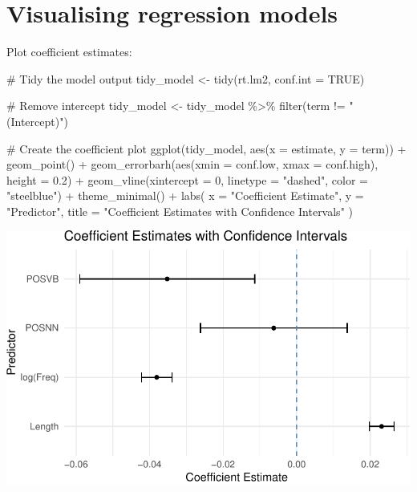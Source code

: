 \documentclass[
  11pt,
  letterpaper,
  DIV=11,
  numbers=noendperiod]{scrreprt}
\newenvironment{Shaded}{\begin{snugshade}}{\end{snugshade}}
\newcommand{\AttributeTok}[1]{\textcolor[rgb]{0.40,0.45,0.13}{#1}}
\newcommand{\CommentTok}[1]{\textcolor[rgb]{0.37,0.37,0.37}{#1}}
\newcommand{\ConstantTok}[1]{\textcolor[rgb]{0.56,0.35,0.01}{#1}}
\newcommand{\DecValTok}[1]{\textcolor[rgb]{0.68,0.00,0.00}{#1}}
\newcommand{\FloatTok}[1]{\textcolor[rgb]{0.68,0.00,0.00}{#1}}
\newcommand{\FunctionTok}[1]{\textcolor[rgb]{0.28,0.35,0.67}{#1}}
\newcommand{\NormalTok}[1]{\textcolor[rgb]{0.00,0.23,0.31}{#1}}
\newcommand{\OtherTok}[1]{\textcolor[rgb]{0.00,0.23,0.31}{#1}}
\newcommand{\SpecialCharTok}[1]{\textcolor[rgb]{0.37,0.37,0.37}{#1}}
\newcommand{\StringTok}[1]{\textcolor[rgb]{0.13,0.47,0.30}{#1}}
\begin{document}
\section{Visualising regression
models}\label{visualising-regression-models}

Plot coefficient estimates:

\begin{Shaded}
\begin{Highlighting}[]
\CommentTok{\# Tidy the model output}
\NormalTok{tidy\_model }\OtherTok{\textless{}{-}} \FunctionTok{tidy}\NormalTok{(rt.lm2, }\AttributeTok{conf.int =} \ConstantTok{TRUE}\NormalTok{)}

\CommentTok{\# Remove intercept}
\NormalTok{tidy\_model }\OtherTok{\textless{}{-}}\NormalTok{ tidy\_model }\SpecialCharTok{\%\textgreater{}\%} \FunctionTok{filter}\NormalTok{(term }\SpecialCharTok{!=} \StringTok{"(Intercept)"}\NormalTok{)}

\CommentTok{\# Create the coefficient plot}
\FunctionTok{ggplot}\NormalTok{(tidy\_model, }\FunctionTok{aes}\NormalTok{(}\AttributeTok{x =}\NormalTok{ estimate, }\AttributeTok{y =}\NormalTok{ term)) }\SpecialCharTok{+}
  \FunctionTok{geom\_point}\NormalTok{() }\SpecialCharTok{+}
  \FunctionTok{geom\_errorbarh}\NormalTok{(}\FunctionTok{aes}\NormalTok{(}\AttributeTok{xmin =}\NormalTok{ conf.low, }\AttributeTok{xmax =}\NormalTok{ conf.high), }\AttributeTok{height =} \FloatTok{0.2}\NormalTok{) }\SpecialCharTok{+}
  \FunctionTok{geom\_vline}\NormalTok{(}\AttributeTok{xintercept =} \DecValTok{0}\NormalTok{, }\AttributeTok{linetype =} \StringTok{"dashed"}\NormalTok{, }\AttributeTok{color =} \StringTok{"steelblue"}\NormalTok{) }\SpecialCharTok{+}
  \FunctionTok{theme\_minimal}\NormalTok{() }\SpecialCharTok{+}
  \FunctionTok{labs}\NormalTok{(}
    \AttributeTok{x =} \StringTok{"Coefficient Estimate"}\NormalTok{,}
    \AttributeTok{y =} \StringTok{"Predictor"}\NormalTok{,}
    \AttributeTok{title =} \StringTok{"Coefficient Estimates with Confidence Intervals"}
\NormalTok{  )}
\end{Highlighting}
\end{Shaded}

\includegraphics{Linear_regression_files/figure-pdf/unnamed-chunk-11-1.pdf}
\end{document}
